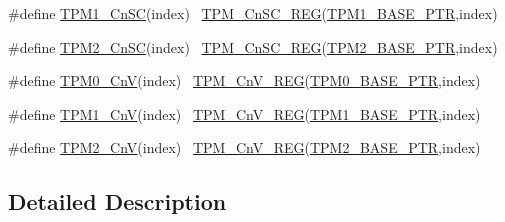 \begin{DoxyCompactItemize}
\item 
\#define \hyperlink{group___t_p_m___register___accessor___macros_ga8b5422fffeb17f1bd0705c1126007d82}{T\+P\+M1\+\_\+\+Cn\+SC}(index)                                              ~\hyperlink{group___t_p_m___register___accessor___macros_ga612e0c2a24983917789f2aed9f2da10f}{T\+P\+M\+\_\+\+Cn\+S\+C\+\_\+\+R\+EG}(\hyperlink{group___t_p_m___peripheral_ga3c3f533f8c87c74f2bbc3a4de83d1181}{T\+P\+M1\+\_\+\+B\+A\+S\+E\+\_\+\+P\+TR},index)
\item 
\#define \hyperlink{group___t_p_m___register___accessor___macros_ga3799c1137e6a3f58291a39e02bb16451}{T\+P\+M2\+\_\+\+Cn\+SC}(index)                                              ~\hyperlink{group___t_p_m___register___accessor___macros_ga612e0c2a24983917789f2aed9f2da10f}{T\+P\+M\+\_\+\+Cn\+S\+C\+\_\+\+R\+EG}(\hyperlink{group___t_p_m___peripheral_ga37cc120e7475fb646fe9bc15b57f06bc}{T\+P\+M2\+\_\+\+B\+A\+S\+E\+\_\+\+P\+TR},index)
\item 
\#define \hyperlink{group___t_p_m___register___accessor___macros_gaecee7b1eb9f9b79a94cec6ec7f5fa88a}{T\+P\+M0\+\_\+\+CnV}(index)                                                ~\hyperlink{group___t_p_m___register___accessor___macros_ga50a6b115bed330d80e9ffe89ddcf316b}{T\+P\+M\+\_\+\+Cn\+V\+\_\+\+R\+EG}(\hyperlink{group___t_p_m___peripheral_ga8ba6c6fb69345639750108c3289a24c4}{T\+P\+M0\+\_\+\+B\+A\+S\+E\+\_\+\+P\+TR},index)
\item 
\#define \hyperlink{group___t_p_m___register___accessor___macros_gace974defb4b116f32ccc9a2bb377269c}{T\+P\+M1\+\_\+\+CnV}(index)                                                ~\hyperlink{group___t_p_m___register___accessor___macros_ga50a6b115bed330d80e9ffe89ddcf316b}{T\+P\+M\+\_\+\+Cn\+V\+\_\+\+R\+EG}(\hyperlink{group___t_p_m___peripheral_ga3c3f533f8c87c74f2bbc3a4de83d1181}{T\+P\+M1\+\_\+\+B\+A\+S\+E\+\_\+\+P\+TR},index)
\item 
\#define \hyperlink{group___t_p_m___register___accessor___macros_gaeb66a58b518738992bc74d847c244ae8}{T\+P\+M2\+\_\+\+CnV}(index)                                                ~\hyperlink{group___t_p_m___register___accessor___macros_ga50a6b115bed330d80e9ffe89ddcf316b}{T\+P\+M\+\_\+\+Cn\+V\+\_\+\+R\+EG}(\hyperlink{group___t_p_m___peripheral_ga37cc120e7475fb646fe9bc15b57f06bc}{T\+P\+M2\+\_\+\+B\+A\+S\+E\+\_\+\+P\+TR},index)
\end{DoxyCompactItemize}


\subsection{Detailed Description}


